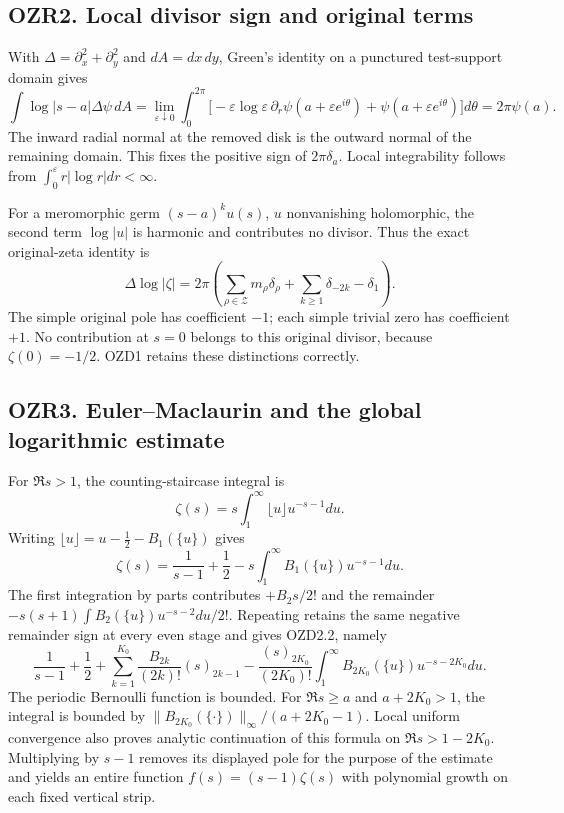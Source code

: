 \subsection{OZR2. Local divisor sign and original
terms}\label{ozr2.-local-divisor-sign-and-original-terms}

With \(\Delta=\partial_x^2+\partial_y^2\) and \(dA=dx\,dy\), Green's
identity on a punctured test-support domain gives \[
\int \log|s-a|\Delta\psi\,dA
=\lim_{\varepsilon\downarrow0}\int_0^{2\pi}
\bigl[-\varepsilon\log\varepsilon\,\partial_r\psi(a+\varepsilon e^{i\theta})
+\psi(a+\varepsilon e^{i\theta})\bigr]d\theta
=2\pi\psi(a).
\tag{OZR2.1}
\] The inward radial normal at the removed disk is the outward normal of
the remaining domain. This fixes the positive sign of \(2\pi\delta_a\).
Local integrability follows from
\(\int_0^\varepsilon r|\log r|dr<\infty\).

For a meromorphic germ \((s-a)^ku(s)\), \(u\) nonvanishing holomorphic,
the second term \(\log|u|\) is harmonic and contributes no divisor. Thus
the exact original-zeta identity is \[
\Delta\log|\zeta|
=2\pi\left(\sum_{\rho\in\mathscr Z}m_\rho\delta_\rho
+\sum_{k\ge1}\delta_{-2k}-\delta_1\right).
\tag{OZR2.2}
\] The simple original pole has coefficient \(-1\); each simple trivial
zero has coefficient \(+1\). No contribution at \(s=0\) belongs to this
original divisor, because \(\zeta(0)=-1/2\). OZD1 retains these
distinctions correctly.

\subsection{OZR3. Euler--Maclaurin and the global logarithmic
estimate}\label{ozr3.-eulermaclaurin-and-the-global-logarithmic-estimate}

For \(\Re s>1\), the counting-staircase integral is \[
\zeta(s)=s\int_1^\infty\lfloor u\rfloor u^{-s-1}du.
\] Writing \(\lfloor u\rfloor=u-\tfrac12-B_1(\{u\})\) gives \[
\zeta(s)=\frac1{s-1}+\frac12-s\int_1^\infty B_1(\{u\})u^{-s-1}du.
\] The first integration by parts contributes \(+B_2s/2!\) and the
remainder \(-s(s+1)\int B_2(\{u\})u^{-s-2}du/2!\). Repeating retains the
same negative remainder sign at every even stage and gives OZD2.2,
namely \[
\frac1{s-1}+\frac12+
\sum_{k=1}^{K_0}\frac{B_{2k}}{(2k)!}(s)_{2k-1}
-\frac{(s)_{2K_0}}{(2K_0)!}\int_1^\infty B_{2K_0}(\{u\})u^{-s-2K_0}du.
\tag{OZR3.1}
\] The periodic Bernoulli function is bounded. For \(\Re s\ge a\) and
\(a+2K_0>1\), the integral is bounded by
\(\|B_{2K_0}(\{\cdot\})\|_\infty/(a+2K_0-1)\). Local uniform convergence
also proves analytic continuation of this formula on \(\Re s>1-2K_0\).
Multiplying by \(s-1\) removes its displayed pole for the purpose of the
estimate and yields an entire function \(f(s)=(s-1)\zeta(s)\) with
polynomial growth on each fixed vertical strip.

